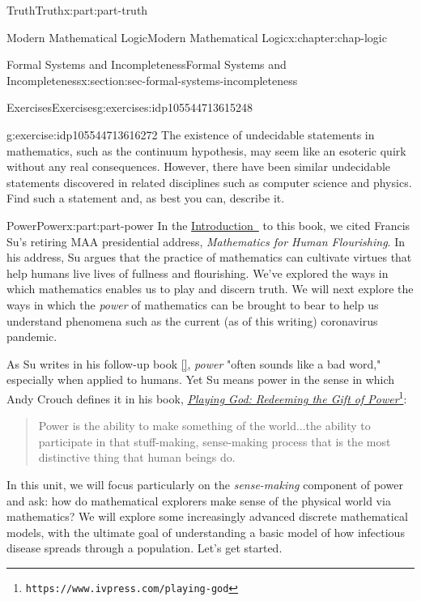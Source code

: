 \documentclass[oneside,10pt,]{book}
\newcommand{\xreffont}{\relax}
\numberwithin{equation}{section}
\begin{document}
\begin{partptx}{Truth}{}{Truth}{}{}{x:part:part-truth}
\begin{chapterptx}{Modern Mathematical Logic}{}{Modern Mathematical Logic}{}{}{x:chapter:chap-logic}
\begin{sectionptx}{Formal Systems and Incompleteness}{}{Formal Systems and Incompleteness}{}{}{x:section:sec-formal-systems-incompleteness}
\begin{exercises-subsection}{Exercises}{}{Exercises}{}{}{g:exercises:idp105544713615248}
\begin{divisionexercise}{2}{}{}{g:exercise:idp105544713616272}
The existence of undecidable statements in mathematics, such as the continuum hypothesis, may seem like an esoteric quirk without any real consequences. However, there have been similar undecidable statements discovered in related disciplines such as computer science and physics. Find such a statement and, as best you can, describe it.%
\end{divisionexercise}%
\end{exercises-subsection}
\end{sectionptx}
\end{chapterptx}
\end{partptx}
%
%
\typeout{************************************************}
\typeout{************************************************}
%
\begin{partptx}{Power}{}{Power}{}{}{x:part:part-power}
 In the \hyperref[x:preface:Sec-Introduction]{Introduction~} to this book, we cited Francis Su's retiring MAA presidential address, \emph{Mathematics for Human Flourishing}. In his address, Su argues that the practice of mathematics can cultivate virtues that help humans live lives of fullness and flourishing. We've explored the ways in which mathematics enables us to play and discern truth. We will next explore the ways in which the \emph{power} of mathematics can be brought to bear to help us understand phenomena such as the current (as of this writing) coronavirus pandemic.%
\par
As Su writes in his follow-up book \hyperlink{x:biblio:Su2020}{[{\xreffont 1}]}, \emph{power} "often sounds like a bad word," especially when applied to humans. Yet Su means power in the sense in which Andy Crouch defines it in his book, \href{https://www.ivpress.com/playing-god}{\emph{Playing God: Redeeming the Gift of Power}}\footnote{\nolinkurl{https://www.ivpress.com/playing-god}\label{g:fn:idp105544713621136}}:%
\begin{quote}%
Power is the ability to make something of the world...the ability to participate in that stuff-making, sense-making process that is the most distinctive thing that human beings do.\end{quote}
In this unit, we will focus particularly on the \emph{sense-making} component of power and ask: how do mathematical explorers make sense of the physical world via mathematics? We will explore some increasingly advanced discrete mathematical models, with the ultimate goal of understanding a basic model of how infectious disease spreads through a population. Let's get started.%

\end{partptx}
\end{document}
